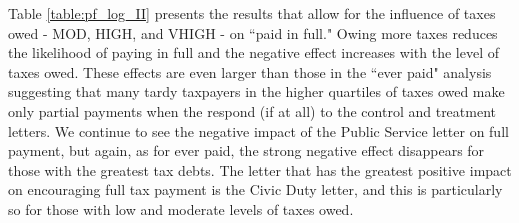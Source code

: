 \documentclass[12pt,titlepage]{article}
\begin{document}
Table \ref{table:pf_log_II} presents the results that allow for the influence of
taxes owed - MOD, HIGH, and VHIGH - on ``paid in full."  Owing more
taxes reduces the likelihood of paying in full and the negative effect
increases with the level of taxes owed.  These effects are even larger
than those in the ``ever paid" analysis suggesting that many tardy
taxpayers in the higher quartiles of taxes owed make only partial
payments when the respond (if at all) to the control and treatment
letters.  We continue to see the negative impact of the Public Service
letter on full payment, but again, as for ever paid, the strong
negative effect disappears for those with the greatest tax debts.  The
letter that has the greatest positive impact on encouraging full tax
payment is the Civic Duty letter, and this is particularly so for
those with low and moderate levels of taxes owed.
\end{document}
